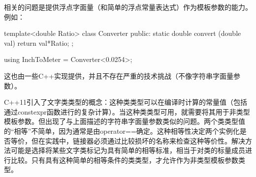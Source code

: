 相关的问题是提供浮点字面量（和简单的浮点常量表达式）作为模板参数的能力。例如：

\begin{cpp}
template<double Ratio>
class Converter {
	public:
	static double convert (double val) {
		return val*Ratio;
	}
};

using InchToMeter = Converter<0.0254>;
\end{cpp}

这也由一些C++实现提供，并且不存在严重的技术挑战（不像字符串字面量参数）。

C++11引入了文字类类型的概念：这种类类型可以在编译时计算的常量值（包括通过constexpr函数进行的复杂计算）。当这种类类型可用，就需要将其用于非类型模板参数。但出现了与上面描述的字符串字面量参数类似的问题。两个类类型值的“相等”不简单，因为通常是由operator==确定。这种相等性决定两个实例化是否等价，但在实践中，链接器必须通过比较损坏的名称来检查这种等价性。解决方法可能是选择将某些文字类标记为具有简单的相等标准，相当于对类的标量成员进行比较。只有具有这种简单的相等条件的类类型，才允许作为非类型模板参数类型。




































